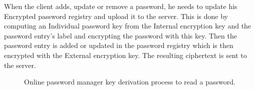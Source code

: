 ﻿\documentclass[../report.tex]{subfiles}
\begin{document}
When the client adds, update or remove a password, he needs to update his Encrypted password registry and upload it to the server. This is done by computing an Individual password key from the Internal encryption key and the password entry's label and encrypting the password with this key. Then the password entry is added or updated in the password registry which is then encrypted with the External encryption key. The resulting ciphertext is sent to the server.

\begin{figure}[h]
 \centering
 \setlength{\fboxsep}{10pt}
 \setlength{\fboxrule}{1pt}
 \caption{Online password manager key derivation process to read a password.}
 \label{fig:Online_password_manager}
\end{figure}
\end{document}
